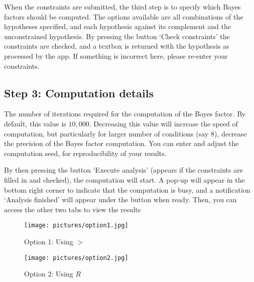 \documentclass[11pt, fullpage, a4paper]{article}
\begin{document}
	When the constraints are submitted, the third step is to specify which Bayes factors should be computed.
	The options available are all combinations of the hypotheses specified, and each hypothesis against its complement and the unconstrained hypothesis.
	By pressing the button `Check constraints' the constraints are checked, and a textbox is returned with the hypothesis as processed by the app. 
	If something is incorrect here, please re-enter your constraints.
	
	\subsection{Step 3: Computation details}
The number of iterations required for the computation of the Bayes factor. 
	By default, this value is $10,000$. 
	Decreasing this value will increase the speed of computation, but particularly for larger number of conditions (say $8$), decrease the precision of the Bayes factor computation.
	You can enter and adjust the computation seed, for reproducibility of your results.
	
	By then pressing the button `Execute analysis' (appears if the constraints are filled in and checked), the computation will start. 
	A pop-up will appear in the bottom right corner to indicate that the computation is busy, and a notification `Analysis finished' will appear under the button when ready.
	Then, you can access the other two tabs to view the results
				\begin{figure}
					\caption{Option 1: Using $>$}
					\label{fig:ineq}
					\texttt{[image: pictures/option1.jpg]}										
				\end{figure}
				
				\begin{figure}
					\caption{Option 2: Using $R$}
					\label{fig:R}
					\texttt{[image: pictures/option2.jpg]}
				\end{figure}

	
	
	
	\clearpage
	\newpage
	
			
\end{document}
